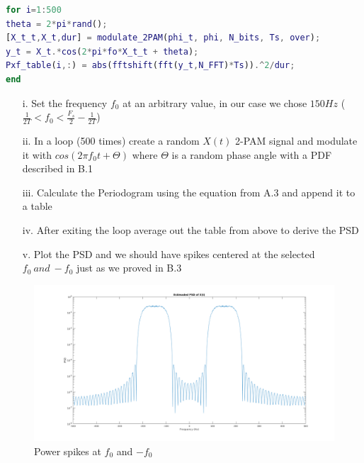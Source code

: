 \documentclass[12pt, a4paper]{article}
\begin{document}
\begin{enumerate}
\begin{enumerate}
\begin{lstlisting}[language=MATLAB]
for i=1:500
theta = 2*pi*rand();
[X_t_t,X_t,dur] = modulate_2PAM(phi_t, phi, N_bits, Ts, over);
y_t = X_t.*cos(2*pi*fo*X_t_t + theta);
Pxf_table(i,:) = abs(fftshift(fft(y_t,N_FFT)*Ts)).^2/dur;
end
		\end{lstlisting}
		\begin{enumerate}
			\item[i.] Set the frequency \(f_0\) at an arbitrary value, in our case we chose \(150 Hz\) (\(\frac{1}{2T} < f_0 < \frac{F_s}{2} - \frac{1}{2T}\))
			\item[ii.] In a loop (500 times) create a random \(X(t)\) 2-PAM signal and modulate it with \(cos(2\pi f_0t + \Theta)\) where \(\Theta\) is a random phase angle with a PDF described in B.1
			\item[iii.]	Calculate the Periodogram using the equation from A.3 and append it to a table 
			\item[iv.] After exiting the loop average out the table from above to derive the PSD
			\item[v.] Plot the PSD and we should have spikes centered at the selected \(f_0\ and\ -f_0\) just as we proved in B.3
		\end{enumerate}
		 \begin{figure}[H]
			\centering
			\noindent\includegraphics[width=\textwidth]{RAND_PSD.png}
			\caption{Power spikes at \(f_0\) and \(-f_0\)}
		\end{figure}
	\end{enumerate}
\end{enumerate}
\end{document}
